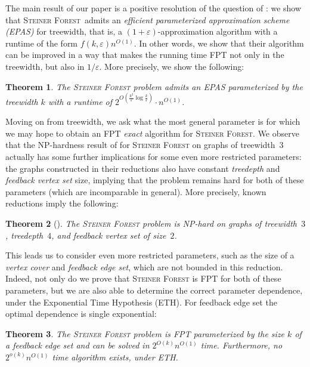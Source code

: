 \documentclass[a4paper]{article}
\let\oldcitet\citet
\renewcommand{\citet}[1]{\mbox{\oldcitet{#1}}}
\theoremstyle{plain}
\newtheorem{theorem}{Theorem}%
\newcommand{\eps}{{\varepsilon}}
\newcommand{\pname}[1]{\textsc{#1}}
\newcommand{\SF}{\pname{Steiner Forest}\xspace}
\begin{document}
The main result of our paper is a positive resolution of the question of
\citet{bateni2011approximation}: we show that \SF\ admits an \emph{efficient
parameterized approximation scheme (EPAS)} for treewidth, that is, a
$(1+\eps)$-approximation algorithm with a runtime of the form
$f(k,\eps)n^{O(1)}$. In other words, we show that their algorithm can be
improved in a way that makes the running time FPT not only in the treewidth,
but also in $1/\eps$. More precisely, we show the following:



\begin{theorem}\label{thm:tw-EPAS}
The \SF problem admits an EPAS parameterized by the treewidth $k$ with a runtime of $2^{O(\frac{k^2}{\eps}\log\frac{k}{\eps})}\cdot n^{O(1)}$.
\end{theorem}


%

Moving on from treewidth, we ask what the most general
parameter is for which we may hope to obtain an FPT \emph{exact} algorithm for
\SF. We observe that the NP-hardness result of \citet{gassner2010steiner,
bateni2011approximation} for \SF on graphs of treewidth~$3$ actually has some
further implications for some even more restricted parameters: the graphs
constructed in their reductions also have constant \emph{treedepth} and
\emph{feedback vertex set} size, implying that the problem remains hard for
both of these parameters (which are incomparable in general). More
precisely, known reductions imply the following:

\begin{theorem}[\citet{gassner2010steiner,bateni2011approximation}]
The \SF problem is NP-hard on graphs of treewidth~$3$, treedepth~$4$, and feedback vertex set of size~$2$.
\end{theorem}

This leads us to consider even more restricted parameters, such as the size of
a \emph{vertex cover} and \emph{feedback edge set}, which are not bounded in
this reduction. Indeed, not only do we prove that \SF is FPT for both of these
parameters, but we are also able to determine the correct parameter dependence,
under the Exponential Time Hypothesis (ETH). For feedback edge set the optimal dependence is single
exponential:  

\begin{theorem}\label{thm:fes}
The \SF problem is FPT parameterized by the size $k$ of a feedback edge set and can be solved in $2^{O(k)}n^{O(1)}$ time.
Furthermore, no $2^{o(k)}n^{O(1)}$ time algorithm exists, under ETH.
\end{theorem}
\end{document}

